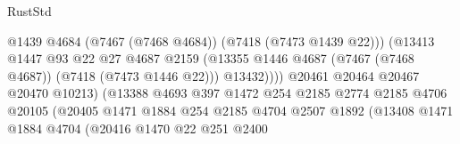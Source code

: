 \begin{lexlean}{RustStd}
\begin{coremodule}
                                                  @1439
                                                  @4684
                                                  (@7467 (@7468 @4684))
                                                  (@7418 (@7473 @1439 @22)))
                                                (@13413
                                                  @1447
                                                  @93
                                                  @22
                                                  @27
                                                  @4687
                                                  @2159
                                                  (@13355
                                                    @1446
                                                    @4687
                                                    (@7467 (@7468 @4687))
                                                    (@7418 (@7473 @1446 @22)))
                                                  @13432))))
                                          @20461
                                          @20464
                                          @20467
                                          @20470
                                          @10213)
                                        (@13388
                                          @4693
                                          @397
                                          @1472
                                          @254
                                          @2185
                                          @2774
                                          @2185
                                          @4706
                                          @20105
                                          (@20405
                                            @1471
                                            @1884
                                            @254
                                            @2185
                                            @4704
                                            @2507
                                            @1892
                                            (@13408
                                              @1471
                                              @1884
                                              @4704
                                              (@20416
                                                @1470
                                                @22
                                                @251
                                                @2400

\end{coremodule}
\end{lexlean}
